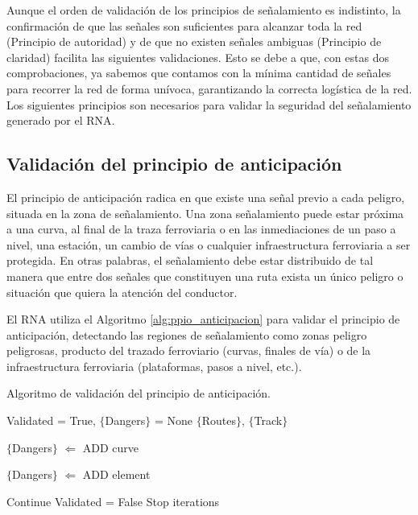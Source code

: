 		Aunque el orden de validación de los principios de señalamiento es indistinto, la confirmación de que las señales son suficientes para alcanzar toda la red (Principio de autoridad) y de que no existen señales ambiguas (Principio de claridad) facilita las siguientes validaciones. Esto se debe a que, con estas dos comprobaciones, ya sabemos que contamos con la mínima cantidad de señales para recorrer la red de forma unívoca, garantizando la correcta logística de la red. Los siguientes principios son necesarios para validar la seguridad del señalamiento generado por el RNA.
		
	\subsection{Validación del principio de anticipación}
		
		El principio de anticipación radica en que existe una señal previo a cada peligro, situada en la zona de señalamiento. Una zona señalamiento puede estar próxima a una curva, al final de la traza ferroviaria o en las inmediaciones de un paso a nivel, una estación, un cambio de vías o cualquier infraestructura ferroviaria a ser protegida. En otras palabras, el señalamiento debe estar distribuido de tal manera que entre dos señales que constituyen una ruta exista un único peligro o situación que quiera la atención del conductor.
		
		El RNA utiliza el Algoritmo \ref{alg:ppio_anticipacion} para validar el principio de anticipación, detectando las regiones de señalamiento como zonas peligro peligrosas, producto del trazado ferroviario (curvas, finales de vía) o de la infraestructura ferroviaria (plataformas, pasos a nivel, etc.). 
		
		\begin{algorithm}[hbt!]
			\caption{Algoritmo de validación del principio de anticipación.}\label{alg:ppio_anticipacion}
			\DontPrintSemicolon
			\SetNoFillComment
			\LinesNotNumbered 
			Validated = True, $\{$Dangers$\}$ = None\;
			$\{$Routes$\}$, $\{$Track$\}$\; 
		
			
			{
				$\{$Dangers$\}$ $\Leftarrow$ ADD curve
			}
			
			{
				$\{$Dangers$\}$ $\Leftarrow$ ADD element
			}
			
			{
				
				{
					{
						Continue\;
					}
					\Else
					{
						Validated = False\; 
						Stop iterations\;
					}
				}	
			}
			
		\end{algorithm}
		
